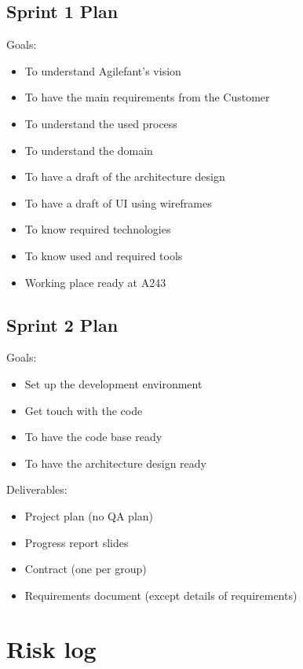 \subsection{Sprint 1 Plan}

Goals:
\begin{itemize}
\item To understand Agilefant's vision
\item To have the main requirements from the Customer
\item To understand the used process
\item To understand the domain
\item To have a draft of the architecture design
\item To have a draft of UI using wireframes
\item To know required technologies
\item To know used and required tools
\item Working place ready at A243
\end{itemize}

\subsection{Sprint 2 Plan}

Goals:
\begin{itemize}
\item Set up the development environment
\item Get touch with the code 
\item To have the code base ready 
\item To have the architecture design ready
\end{itemize}

\noindent Deliverables:
\begin{itemize}
\item Project plan (no QA plan)
\item Progress report slides
\item Contract (one per group)
\item Requirements document (except details of requirements)
\end{itemize}

\section{Risk log}

